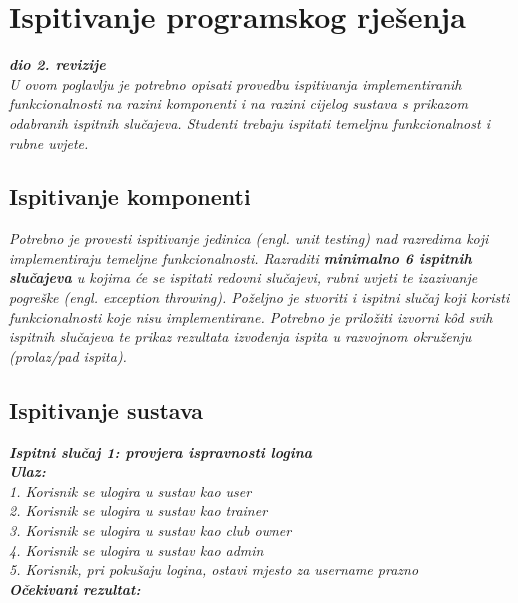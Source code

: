 			
			\eject 
		
	
		\section{Ispitivanje programskog rješenja}
			
			\textbf{\textit{dio 2. revizije}}\\
			
			 \textit{U ovom poglavlju je potrebno opisati provedbu ispitivanja implementiranih funkcionalnosti na razini komponenti i na razini cijelog sustava s prikazom odabranih ispitnih slučajeva. Studenti trebaju ispitati temeljnu funkcionalnost i rubne uvjete.}
	
			
			\subsection{Ispitivanje komponenti}
			\textit{Potrebno je provesti ispitivanje jedinica (engl. unit testing) nad razredima koji implementiraju temeljne funkcionalnosti. Razraditi \textbf{minimalno 6 ispitnih slučajeva} u kojima će se ispitati redovni slučajevi, rubni uvjeti te izazivanje pogreške (engl. exception throwing). Poželjno je stvoriti i ispitni slučaj koji koristi funkcionalnosti koje nisu implementirane. Potrebno je priložiti izvorni kôd svih ispitnih slučajeva te prikaz rezultata izvođenja ispita u razvojnom okruženju (prolaz/pad ispita). }
			
			
			
			\subsection{Ispitivanje sustava}
			
			\textbf{\textit{Ispitni slučaj 1: provjera ispravnosti logina}}\\
			\textbf{\textit{Ulaz:}}\\
			
			 \textit{1. Korisnik se ulogira u sustav kao user}\\
			 \textit{2. Korisnik se ulogira u sustav kao trainer}\\
			 \textit{3. Korisnik se ulogira u sustav kao club owner}\\
			 \textit{4. Korisnik se ulogira u sustav kao admin}\\
			 \textit{5. Korisnik, pri pokušaju logina, ostavi mjesto za username prazno}\\

			 \textbf{\textit{Očekivani rezultat:}}\\

